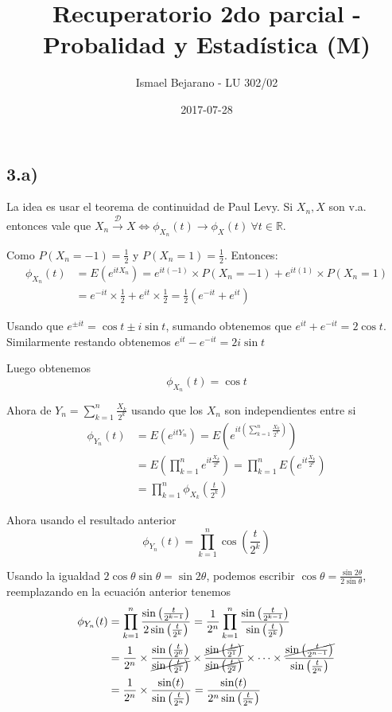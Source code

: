 \documentclass[a4paper,10pt]{article}
\title{Recuperatorio 2do parcial - Probalidad y Estadística (M)}
\author{Ismael Bejarano - LU 302/02}
\date{2017-07-28}
\begin{document}
\maketitle

\subsection*{3.a)}

La idea es usar el teorema de continuidad de Paul Levy. Si $X_n, X$ son v.a.
entonces vale que $X_n \overset{\mathcal D}{\rightarrow} X \iff
\phi_{X_n}(t) \rightarrow \phi_{X}(t)\ \forall t\in \mathbb R$.

Como $P(X_n=-1)=\frac{1}{2}$ y $P(X_n=1)=\frac{1}{2}$. Entonces:
\[
\begin{align*}
\phi_{X_n}(t) &= E(e^{itX_n}) = e^{it(-1)}\times P(X_n=-1) + e^{it(1)}\times P(X_n=1) \\
&= e^{-it}\times\frac{1}{2} + e^{it}\times\frac{1}{2} = \frac{1}{2}(e^{-it} + e^{it})
\end{align*}
\]

Usando que $e^{\pm it} = \cos t \pm i\sin t$, sumando obtenemos que $e^{it}+e^{-it}=2\cos t$. 
Similarmente restando obtenemos $e^{it}-e^{-it}=2i\sin t$

Luego obtenemos
\[\phi_{X_n}(t) = \cos t\]

Ahora de $Y_n = \sum_{k=1}^n \frac{X_k}{2^k}$ usando que los $X_n$ son independientes entre si
\[
\begin{align*}
\phi_{Y_n}(t) &= E(e^{itY_n}) = E\left(e^{it\left(\sum_{k=1}^n \frac{X_k}{2^k}\right)}\right) \\
&= E\left(\prod_{k=1}^n e^{it\frac{X_k}{2^k}}\right) = \prod_{k=1}^n E(e^{it\frac{X_k}{2^k}}) \\
&= \prod_{k=1}^n \phi_{X_k}\left(\frac{t}{2^k}\right)
\end{align*}
\]

Ahora usando el resultado anterior
\[
\phi_{Y_n}(t) = \prod_{k=1}^n \cos\left(\frac{t}{2^k}\right)
\]

Usando la igualdad $2 \cos \theta \sin\theta = \sin 2\theta$, podemos escribir
$\cos \theta = \frac{\sin 2\theta}{2\sin \theta}$, reemplazando en la ecuación anterior
tenemos
\[
\begin{align*}
\phi_{Y_n}(t) &= \prod_{k=1}^n \frac{\sin\left(\frac{t}{2^{k-1}}\right)}{2\sin\left(\frac{t}{2^k}\right)}
= \frac{1}{2^n} \prod_{k=1}^n \frac{\sin\left(\frac{t}{2^{k-1}}\right)}{\sin\left(\frac{t}{2^k}\right)} \\
&= \frac{1}{2^n} \times \frac{\sin\left(\frac{t}{2^{0}}\right)}{\cancel{\sin\left(\frac{t}{2^{1}}\right)}}
\times \frac{\cancel{\sin\left(\frac{t}{2^{1}}\right)}}{\cancel{\sin\left(\frac{t}{2^{2}}\right)}} \times \cdots
\times \frac{\cancel{\sin\left(\frac{t}{2^{n-1}}\right)}}{\sin\left(\frac{t}{2^{n}}\right)} \\
&= \frac{1}{2^n}\times \frac{\sin(t)}{\sin\left(\frac{t}{2^{n}}\right)}
= \frac{\sin(t)}{2^n \sin\left(\frac{t}{2^{n}}\right)}
\end{align*}
\]
\end{document}

